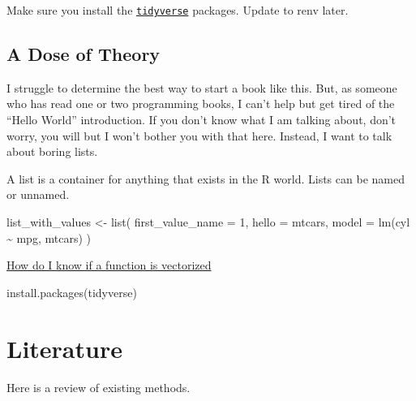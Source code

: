 \documentclass[
]{book}
\newenvironment{Shaded}{\begin{snugshade}}{\end{snugshade}}
\newcommand{\AttributeTok}[1]{\textcolor[rgb]{0.77,0.63,0.00}{#1}}
\newcommand{\DecValTok}[1]{\textcolor[rgb]{0.00,0.00,0.81}{#1}}
\newcommand{\FunctionTok}[1]{\textcolor[rgb]{0.00,0.00,0.00}{#1}}
\newcommand{\NormalTok}[1]{#1}
\newcommand{\OtherTok}[1]{\textcolor[rgb]{0.56,0.35,0.01}{#1}}
\newcommand{\SpecialCharTok}[1]{\textcolor[rgb]{0.00,0.00,0.00}{#1}}
\newcommand{\StringTok}[1]{\textcolor[rgb]{0.31,0.60,0.02}{#1}}
\begin{document}
Make sure you install the \href{https://www.tidyverse.org/}{\texttt{tidyverse}} packages. Update to renv later.

\hypertarget{a-dose-of-theory}{%
\section{A Dose of Theory}\label{a-dose-of-theory}}

I struggle to determine the best way to start a book like this. But, as someone who has read one or two programming books, I can't help but get tired of the ``Hello World'' introduction. If you don't know what I am talking about, don't worry, you will but I won't bother you with that here. Instead, I want to talk about boring lists.

A list is a container for anything that exists in the R world. Lists can be named or unnamed.

\begin{Shaded}
\begin{Highlighting}[]
\NormalTok{list\_with\_values }\OtherTok{\textless{}{-}} \FunctionTok{list}\NormalTok{(}
    \AttributeTok{first\_value\_name =} \DecValTok{1}\NormalTok{, }
    \AttributeTok{hello =}\NormalTok{ mtcars, }
    \AttributeTok{model =} \FunctionTok{lm}\NormalTok{(cyl }\SpecialCharTok{\textasciitilde{}}\NormalTok{ mpg, mtcars)}
\NormalTok{)}
\end{Highlighting}
\end{Shaded}

\href{https://stackoverflow.com/questions/58568392/how-do-i-know-a-function-or-an-operation-in-r-is-vectorized\#:~:text=To\%20identify\%20if\%20an\%20R\%20object\%20is\%20a\%20vector\%20\%2C\%20I,a\%20vector\%20or\%20False\%20otherwise.}{How do I know if a function is vectorized}

\begin{Shaded}
\begin{Highlighting}[]
\FunctionTok{install.packages}\NormalTok{(}\StringTok{\textquotesingle{}tidyverse\textquotesingle{}}\NormalTok{)}
\end{Highlighting}
\end{Shaded}

\hypertarget{literature}{%
\chapter{Literature}\label{literature}}

Here is a review of existing methods.
\end{document}
